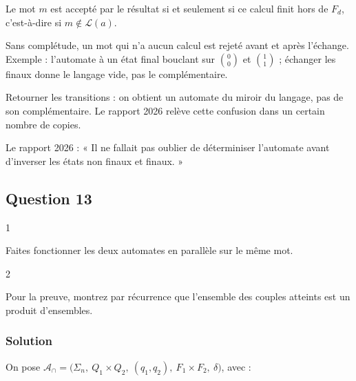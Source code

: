 \documentclass[11pt,a4paper]{article}
\begin{document}
Le mot \(m\) est accepté par le résultat si et seulement si ce calcul finit hors de \(F_d\), c'est-à-dire si \(m\notin\mathcal{L}(a)\).

\begin{piege}

Sans complétude, un mot qui n'a aucun calcul est rejeté avant et après l'échange. Exemple : l'automate à un état final bouclant sur \(\binom00\) et \(\binom11\) ; échanger les finaux donne le langage vide, pas le complémentaire.

\end{piege}

\begin{piege}

Retourner les transitions : on obtient un automate du miroir du langage, pas de son complémentaire. Le rapport 2026 relève cette confusion dans un certain nombre de copies.

\end{piege}

\begin{jury}

Le rapport 2026 : « Il ne fallait pas oublier de déterminiser l'automate avant d'inverser les états non finaux et finaux. »

\end{jury}

\hypertarget{question-13}{%
\subsection{Question 13}\label{question-13}}

\begin{indication}{1}

Faites fonctionner les deux automates en parallèle sur le même mot.

\end{indication}

\begin{indication}{2}

Pour la preuve, montrez par récurrence que l'ensemble des couples atteints est un produit d'ensembles.

\end{indication}

\hypertarget{solution-12}{%
\subsubsection{Solution}\label{solution-12}}

On pose \({\mathcal{A}}_\cap=\big(\Sigma_n,\allowbreak \ Q_1\times Q_2,\allowbreak \ (q_1,\allowbreak q_2),\allowbreak \ F_1\times F_2,\allowbreak \ \delta\big)\), avec :
\end{document}

